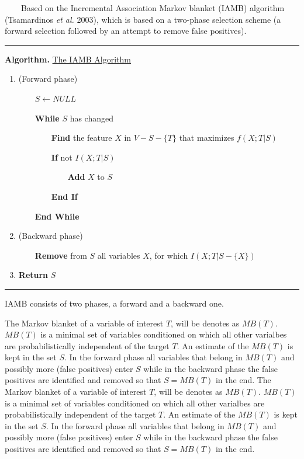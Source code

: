 ~~~~Based on the Incremental Association Markov blanket (IAMB) algorithm (Tsamardinos \emph{et al.} 2003), which is based on a two-phase selection scheme (a forward selection followed by an attempt to remove false positives).

\begin{center}\rule[0.5ex]{0.9\columnwidth}{1pt}\end{center}

\textbf{Algorithm.} \underline{The IAMB Algorithm}

\begin{enumerate}
	\item (Forward phase)
	
	~~~~$S \leftarrow NULL$
	
	~~~~\textbf{While} $S$ has changed
	
	~~~~~~~~\textbf{Find} the feature $X$ in $V-S-\{T\}$ that maximizes $f(X ; T|S)$
	
	~~~~~~~~\textbf{If} not $I(X ; T|S)$
	
	~~~~~~~~~~~~\textbf{Add} $X$ to $S$
	
	~~~~~~~~\textbf{End If}
	
	~~~~\textbf{End While}
	
	\item (Backward phase)

	~~~~\textbf{Remove} from $S$ all variables $X$, for which $I(X ; T|S-\{X\})$
	
	\item \textbf{Return} $S$
\end{enumerate}

\begin{center}\rule[0.5ex]{0.9\columnwidth}{1pt}\end{center}

IAMB consists of two phases, a forward and a backward one.

The Markov blanket of a variable of interest $T$, will be denotes as $MB(T)$. $MB(T)$ is a minimal set of variables conditioned on which all other varialbes are probabilistically independent of the target $T$. An estimate of the $MB(T)$ is kept in the set $S$. In the forward phase all variables that belong in $MB(T)$ and possibly more (false positives) enter $S$ while in the backward phase the false positives are identified and removed so that $S = MB(T)$ in the end.
The Markov blanket of a variable of interest $T$, will be denotes as $MB(T)$. $MB(T)$ is a minimal set of variables conditioned on which all other varialbes are probabilistically independent of the target $T$. An estimate of the $MB(T)$ is kept in the set $S$. In the forward phase all variables that belong in $MB(T)$ and possibly more (false positives) enter $S$ while in the backward phase the false positives are identified and removed so that $S = MB(T)$ in the end.

